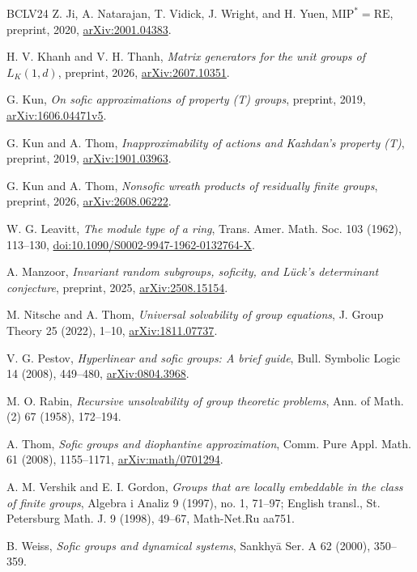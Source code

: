 \documentclass[10pt]{article}
\begin{document}
\begin{thebibliography}{BCLV24}
Z. Ji, A. Natarajan, T. Vidick, J. Wright, and H. Yuen, \emph{$\mathrm{MIP}^{\ast}=\mathrm{RE}$}, preprint, 2020, \url{arXiv:2001.04383}.

H. V. Khanh and V. H. Thanh, \emph{Matrix generators for the unit groups of $L_K(1,d)$}, preprint, 2026, \url{arXiv:2607.10351}.

G. Kun, \emph{On sofic approximations of property (T) groups}, preprint, 2019, \url{arXiv:1606.04471v5}.

G. Kun and A. Thom, \emph{Inapproximability of actions and Kazhdan's property (T)}, preprint, 2019, \url{arXiv:1901.03963}.

G. Kun and A. Thom, \emph{Nonsofic wreath products of residually finite groups}, preprint, 2026, \url{arXiv:2608.06222}.

W. G. Leavitt, \emph{The module type of a ring}, Trans. Amer. Math. Soc. 103 (1962), 113--130, \url{doi:10.1090/S0002-9947-1962-0132764-X}.

A. Manzoor, \emph{Invariant random subgroups, soficity, and Lück's determinant conjecture}, preprint, 2025, \url{arXiv:2508.15154}.

M. Nitsche and A. Thom, \emph{Universal solvability of group equations}, J. Group Theory 25 (2022), 1--10, \url{arXiv:1811.07737}.

V. G. Pestov, \emph{Hyperlinear and sofic groups: A brief guide}, Bull. Symbolic Logic 14 (2008), 449--480, \url{arXiv:0804.3968}.

M. O. Rabin, \emph{Recursive unsolvability of group theoretic problems}, Ann. of Math. (2) 67 (1958), 172--194.

A. Thom, \emph{Sofic groups and diophantine approximation}, Comm. Pure Appl. Math. 61 (2008), 1155--1171, \url{arXiv:math/0701294}.

A. M. Vershik and E. I. Gordon, \emph{Groups that are locally embeddable in the class of finite groups}, Algebra i Analiz 9 (1997), no. 1, 71--97; English transl., St. Petersburg Math. J. 9 (1998), 49--67, Math-Net.Ru aa751.

B. Weiss, \emph{Sofic groups and dynamical systems}, Sankhyā Ser. A 62 (2000), 350--359.

\end{thebibliography}
\end{document}
